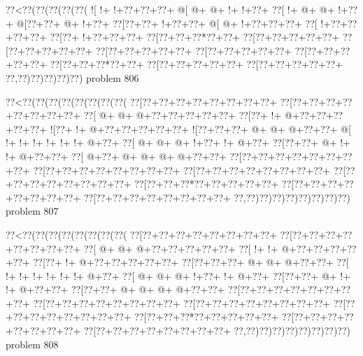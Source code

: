 \vbox{\vbox{\goo
\0??<\0??(\0??(\0??(\0??(\0??(
\- ![\- !+\- !+\0??+\0??+\0??+
\- @[\- @+\- @+\- !+\- !+\0??+
\0??[\- !+\- @+\- @+\- !+\0??+
\- @[\0??+\0??+\- @+\- !+\0??+
\0??[\0??+\0??+\- !+\0??+\0??+
\- @[\- @+\- !+\0??+\0??+\0??+
\0??[\- !+\0??+\0??+\0??+\0??+
\0??[\0??+\- !+\0??+\0??+\0??+
\0??[\0??+\0??+\0??*\0??+\0??+
\0??[\0??+\0??+\0??+\0??+\0??+
\0??[\0??+\0??+\0??+\0??+\0??+
\0??[\0??+\0??+\0??+\0??+\0??+
\0??[\0??+\0??+\0??+\0??+\0??+
\0??[\0??+\0??+\0??+\0??+\0??+
\0??[\0??+\0??+\0??*\0??+\0??+
\0??[\0??+\0??+\0??+\0??+\0??+
\0??[\0??+\0??+\0??+\0??+\0??+
\0??,\0??)\0??)\0??)\0??)\0??)
}
\hfil problem 806\hfil\break
}

\vbox{\vbox{\goo
\0??<\0??(\0??(\0??(\0??(\0??(\0??(\0??(\0??(
\0??[\0??+\0??+\0??+\0??+\0??+\0??+\0??+\0??+
\0??[\0??+\0??+\0??+\0??+\0??+\0??+\0??+\0??+
\0??[\- @+\- @+\- @+\0??+\0??+\0??+\0??+\0??+
\0??[\0??+\- !+\- @+\0??+\0??+\0??+\0??+\0??+
\- ![\0??+\- !+\- @+\0??+\0??+\0??+\0??+\0??+
\- ![\0??+\0??+\0??+\- @+\- @+\- @+\0??+\0??+
\- @[\- !+\- !+\- !+\- !+\- !+\- !+\- @+\0??+
\0??[\- @+\- @+\- @+\- !+\0??+\- !+\- @+\0??+
\0??[\0??+\0??+\- @+\- !+\- !+\- @+\0??+\0??+
\0??[\- @+\0??+\- @+\- @+\- @+\- @+\0??+\0??+
\0??[\0??+\0??+\0??+\0??+\0??+\0??+\0??+\0??+
\0??[\0??+\0??+\0??+\0??+\0??+\0??+\0??+\0??+
\0??[\0??+\0??+\0??+\0??+\0??+\0??+\0??+\0??+
\0??[\0??+\0??+\0??+\0??+\0??+\0??+\0??+\0??+
\0??[\0??+\0??+\0??*\0??+\0??+\0??+\0??+\0??+
\0??[\0??+\0??+\0??+\0??+\0??+\0??+\0??+\0??+
\0??[\0??+\0??+\0??+\0??+\0??+\0??+\0??+\0??+
\0??,\0??)\0??)\0??)\0??)\0??)\0??)\0??)\0??)
}
\hfil problem 807\hfil\break
}

\vbox{\vbox{\goo
\0??<\0??(\0??(\0??(\0??(\0??(\0??(\0??(\0??(
\0??[\0??+\0??+\0??+\0??+\0??+\0??+\0??+\0??+
\0??[\0??+\0??+\0??+\0??+\0??+\0??+\0??+\0??+
\0??[\- @+\- @+\- @+\0??+\0??+\0??+\0??+\0??+
\0??[\- !+\- !+\- @+\0??+\0??+\0??+\0??+\0??+
\0??[\0??+\- !+\- @+\0??+\0??+\0??+\0??+\0??+
\0??[\0??+\0??+\0??+\- @+\- @+\- @+\0??+\0??+
\0??[\- !+\- !+\- !+\- !+\- !+\- !+\- @+\0??+
\0??[\- @+\- @+\- @+\- !+\0??+\- !+\- @+\0??+
\0??[\0??+\0??+\- @+\- !+\- !+\- @+\0??+\0??+
\0??[\0??+\0??+\- @+\- @+\- @+\- @+\0??+\0??+
\0??[\0??+\0??+\0??+\0??+\0??+\0??+\0??+\0??+
\0??[\0??+\0??+\0??+\0??+\0??+\0??+\0??+\0??+
\0??[\0??+\0??+\0??+\0??+\0??+\0??+\0??+\0??+
\0??[\0??+\0??+\0??+\0??+\0??+\0??+\0??+\0??+
\0??[\0??+\0??+\0??*\0??+\0??+\0??+\0??+\0??+
\0??[\0??+\0??+\0??+\0??+\0??+\0??+\0??+\0??+
\0??[\0??+\0??+\0??+\0??+\0??+\0??+\0??+\0??+
\0??,\0??)\0??)\0??)\0??)\0??)\0??)\0??)\0??)
}
\hfil problem 808\hfil\break
}

